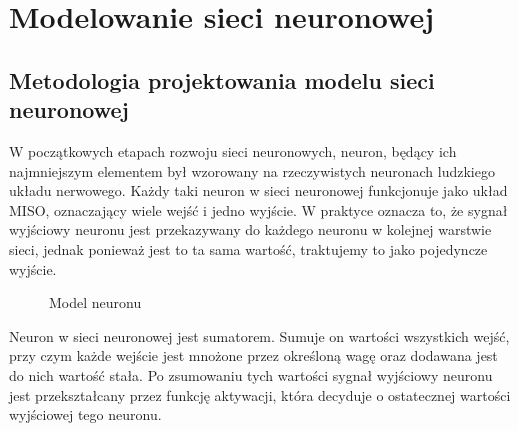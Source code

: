 \documentclass[a4paper,twoside,12pt]{book}
\begin{document}
\chapter{Modelowanie sieci neuronowej}
\label{ch:04}
\section{Metodologia projektowania modelu sieci neuronowej}
W początkowych etapach rozwoju sieci neuronowych, neuron, będący ich najmniejszym elementem był wzorowany na rzeczywistych neuronach ludzkiego układu nerwowego. Każdy taki neuron w sieci neuronowej funkcjonuje jako układ MISO, oznaczający wiele wejść i jedno wyjście. W praktyce oznacza to, że sygnał wyjściowy neuronu jest przekazywany do każdego neuronu w kolejnej warstwie sieci, jednak ponieważ jest to ta sama wartość, traktujemy to jako pojedyncze wyjście.
\begin{figure}[!ht]
	\centering
	\caption{Model neuronu}
	\label{Qp}
\end{figure}

Neuron w sieci neuronowej jest sumatorem. Sumuje on wartości wszystkich wejść, przy czym każde wejście jest mnożone przez określoną wagę oraz dodawana jest do nich wartość stała. Po zsumowaniu tych wartości sygnał wyjściowy neuronu jest przekształcany przez funkcję aktywacji, która decyduje o ostatecznej wartości wyjściowej tego neuronu.\cite{bib:ksiazka_sieci}
\end{document}
